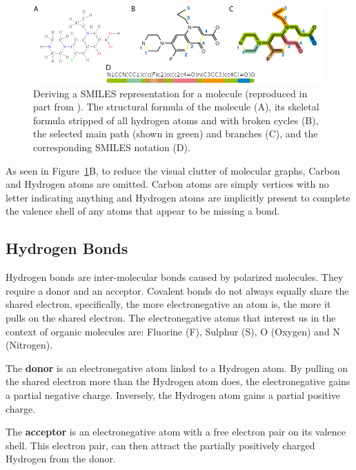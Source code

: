 \documentclass[../Document.tex]{subfiles}
\begin{document}
\begin{figure}[t]
    \centering
    \includegraphics{images/complex_smiles.png}
    \caption[Deriving a SMILES representation for a molecule.]{Deriving a SMILES representation for a molecule (reproduced in part from \cite{wiki:complex-smiles}).
    The structural formula of the molecule (A), its skeletal formula stripped of all hydrogen atoms and with broken cycles (B), the selected main path (shown in green) and branches (C), and the corresponding SMILES notation (D).}
    \label{fig:complex_smiles}
\end{figure}

As seen in Figure~\ref{fig:complex_smiles}B, to reduce the visual clutter of molecular graphs, Carbon and Hydrogen atoms are omitted. Carbon atoms are simply vertices with no letter indicating anything and Hydrogen atoms are implicitly present to complete the valence shell of any atoms that appear to be missing a bond.


\subsection{Hydrogen Bonds}
\label{subsec:intro/chem/hydrogen-bonds}
Hydrogen bonds are inter-molecular bonds caused by polarized molecules. They require a donor and an acceptor.
Covalent bonds do not always equally share the shared electron, specifically, the more electronegative an atom is, the more it pulls on the shared electron.
The electronegative atoms that interest us in the context of organic molecules are: Fluorine (F), Sulphur (S), O (Oxygen) and N (Nitrogen).

The \textbf{donor} is an electronegative atom linked to a Hydrogen atom. By pulling on the shared electron more than the Hydrogen atom does, the electronegative gains a partial negative charge. Inversely, the Hydrogen atom gains a partial positive charge. 

The \textbf{acceptor} is an electronegative atom with a free electron pair on its valence shell. This electron pair, can then attract the partially positively charged Hydrogen from the donor.
\end{document}
